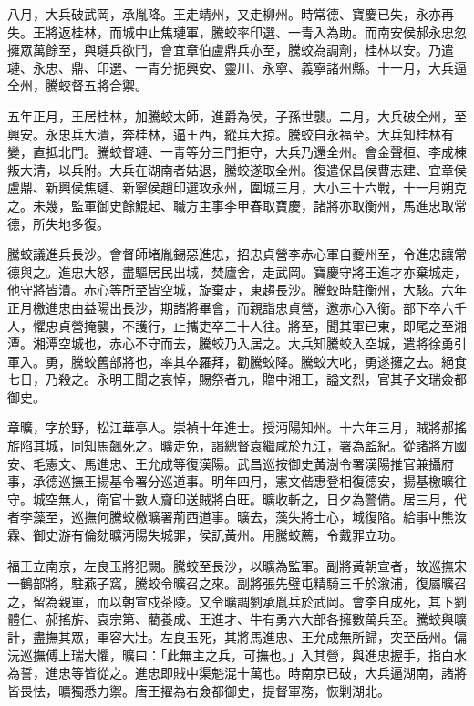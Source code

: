 \begin{pinyinscope}
八月，大兵破武岡，承胤降。王走靖州，又走柳州。時常德、寶慶已失，永亦再失。王將返桂林，而城中止焦璉軍，騰蛟率印選、一青入為助。而南安侯郝永忠忽擁眾萬餘至，與璉兵欲鬥，會宜章伯盧鼎兵亦至，騰蛟為調劑，桂林以安。乃遣璉、永忠、鼎、印選、一青分扼興安、靈川、永寧、義寧諸州縣。十一月，大兵逼全州，騰蛟督五將合禦。

五年正月，王居桂林，加騰蛟太師，進爵為侯，子孫世襲。二月，大兵破全州，至興安。永忠兵大潰，奔桂林，逼王西，縱兵大掠。騰蛟自永福至。大兵知桂林有變，直抵北門。騰蛟督璉、一青等分三門拒守，大兵乃還全州。會金聲桓、李成棟叛大清，以兵附。大兵在湖南者姑退，騰蛟遂取全州。復遣保昌侯曹志建、宜章侯盧鼎、新興侯焦璉、新寧侯趙印選攻永州，圍城三月，大小三十六戰，十一月朔克之。未幾，監軍御史餘鯤起、職方主事李甲春取寶慶，諸將亦取衡州，馬進忠取常德，所失地多復。

騰蛟議進兵長沙。會督師堵胤錫惡進忠，招忠貞營李赤心軍自夔州至，令進忠讓常德與之。進忠大怒，盡驅居民出城，焚廬舍，走武岡。寶慶守將王進才亦棄城走，他守將皆潰。赤心等所至皆空城，旋棄走，東趨長沙。騰蛟時駐衡州，大駭。六年正月檄進忠由益陽出長沙，期諸將畢會，而親詣忠貞營，邀赤心入衡。部下卒六千人，懼忠貞營掩襲，不護行，止攜吏卒三十人往。將至，聞其軍已東，即尾之至湘潭。湘潭空城也，赤心不守而去，騰蛟乃入居之。大兵知騰蛟入空城，遣將徐勇引軍入。勇，騰蛟舊部將也，率其卒羅拜，勸騰蛟降。騰蛟大叱，勇遂擁之去。絕食七日，乃殺之。永明王聞之哀悼，賜祭者九，贈中湘王，謚文烈，官其子文瑞僉都御史。

章曠，字於野，松江華亭人。崇禎十年進士。授沔陽知州。十六年三月，賊將郝搖旂陷其城，同知馬飆死之。曠走免，謁總督袁繼咸於九江，署為監紀。從諸將方國安、毛憲文、馬進忠、王允成等復漢陽。武昌巡按御史黃澍令署漢陽推官兼攝府事，承德巡撫王揚基令署分巡道事。明年四月，憲文偕惠登相復德安，揚基檄曠往守。城空無人，衛官十數人齎印送賊將白旺。曠收斬之，日夕為警備。居三月，代者李藻至，巡撫何騰蛟檄曠署荊西道事。曠去，藻失將士心，城復陷。給事中熊汝霖、御史游有倫劾曠沔陽失城罪，侯訊黃州。用騰蛟薦，令戴罪立功。

福王立南京，左良玉將犯闕。騰蛟至長沙，以曠為監軍。副將黃朝宣者，故巡撫宋一鶴部將，駐燕子窩，騰蛟令曠召之來。副將張先璧屯精騎三千於漵浦，復屬曠召之，留為親軍，而以朝宣戍茶陵。又令曠調劉承胤兵於武岡。會李自成死，其下劉體仁、郝搖旂、袁宗第、藺養成、王進才、牛有勇六大部各擁數萬兵至。騰蛟與曠計，盡撫其眾，軍容大壯。左良玉死，其將馬進忠、王允成無所歸，突至岳州。偏沅巡撫傅上瑞大懼，曠曰：「此無主之兵，可撫也。」入其營，與進忠握手，指白水為誓，進忠等皆從之。進忠即賊中渠魁混十萬也。時南京已破，大兵逼湖南，諸將皆畏怯，曠獨悉力禦。唐王擢為右僉都御史，提督軍務，恢剿湖北。


\end{pinyinscope}
